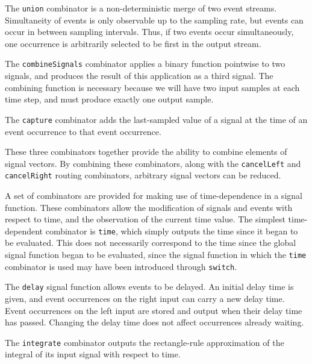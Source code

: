 The {\tt union} combinator is a non-deterministic merge of two event streams.
Simultaneity of events is only observable up to the sampling rate, but events
can occur in between sampling intervals. Thus, if two events occur
simultaneously, one occurrence is arbitrarily selected to be first in the output
stream.

The {\tt combineSignals} combinator applies a binary function pointwise to two
signals, and produces the result of this application as a third signal. The
combining function is necessary because we will have two input samples at each
time step, and must produce exactly one output sample.

The {\tt capture} combinator adds the last-sampled value of a signal at the time
of an event occurrence to that event occurrence.

These three combinators  together provide the ability to combine elements of
signal vectors. By combining these combinators, along with the {\tt cancelLeft}
and {\tt cancelRight} routing combinators, arbitrary signal vectors can be
reduced.

A set of combinators are provided for making use of time-dependence in a signal
function. These combinators allow the modification of signals and events with
respect to time, and the observation of the current time value.
%
The simplest time-dependent combinator is {\tt time}, which simply outputs
the time since it began to be evaluated. This does not necessarily correspond to
the time since the global signal function began to be evaluated, since the
signal function in which the {\tt time} combinator is used may have been
introduced through {\tt switch}.


The {\tt delay} signal function allows events to be delayed. An initial delay
time is given, and event occurrences on the right input can carry a new delay
time. Event occurrences on the left input are stored and output when their delay
time has passed. Changing the delay time does not affect occurrences already
waiting.

The {\tt integrate} combinator outputs the rectangle-rule approximation of the
integral of its input signal with respect to time.



